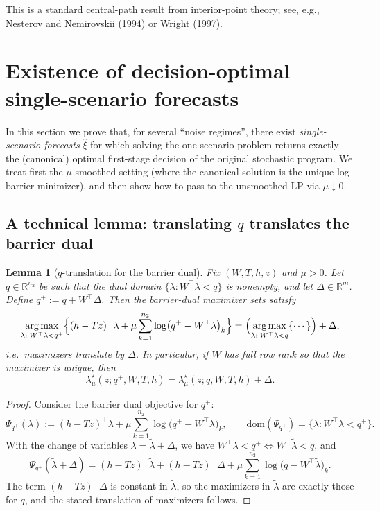\documentclass[11pt]{article}
\theoremstyle{plain}
\newtheorem{lemma}[theorem]{Lemma}
\theoremstyle{definition}
\theoremstyle{remark}
\newcommand{\argmax}{\operatorname*{arg\,max}}
\begin{document}
This is a standard central-path result from interior-point theory; see, e.g., Nesterov and Nemirovskii (1994) or Wright (1997).


\section{Existence of decision-optimal single-scenario forecasts}\label{sec:existence}

In this section we prove that, for several ``noise regimes'', there exist \emph{single-scenario forecasts}
$\hat\xi$ for which solving the one-scenario problem returns exactly the (canonical) optimal first-stage
decision of the original stochastic program. We treat first the $\mu$-smoothed setting (where the canonical
solution is the unique log-barrier minimizer), and then show how to pass to the unsmoothed LP via
$\mu\downarrow 0$.

\subsection[A technical lemma: translating q translates the barrier dual]{A technical lemma: translating $q$ translates the barrier dual}\label{subsec:q-translation}

\begin{lemma}[$q$-translation for the barrier dual]\label{lem:q-translation}
Fix $(W,T,h,z)$ and $\mu>0$. Let $q\in\mathbb{R}^{n_2}$ be such that the dual domain
$\{\lambda:W^\top\lambda<q\}$ is nonempty, and let $\Delta\in\mathbb{R}^m$.
Define $q^+:=q+W^\top\Delta$.
Then the barrier-dual maximizer sets satisfy
\begin{equation}\label{eq:q-translation}
\argmax_{\lambda:\;W^\top\lambda<q^+}
\Bigl\{(h-Tz)^\top\lambda+\mu\sum_{k=1}^{n_2}\log\bigl(q^+-W^\top\lambda\bigr)_k\Bigr\}
=
\Bigl(\argmax_{\lambda:\;W^\top\lambda<q}
\{\cdots\}\Bigr)+\Delta,
\end{equation}
i.e.\ maximizers translate by $\Delta$. In particular, if $W$ has full row rank so that the maximizer is unique,
then
\[
\lambda_\mu^\star(z;q^+,W,T,h)=\lambda_\mu^\star(z;q,W,T,h)+\Delta.
\]
\end{lemma}

\begin{proof}
Consider the barrier dual objective for $q^+$:
\[
\Psi_{q^+}(\lambda)
:=
(h-Tz)^\top\lambda+\mu\sum_{k=1}^{n_2}\log\bigl(q^+-W^\top\lambda\bigr)_k,
\qquad\text{dom}(\Psi_{q^+})=\{\lambda:W^\top\lambda<q^+\}.
\]
With the change of variables $\lambda=\tilde\lambda+\Delta$, we have
$W^\top\lambda<q^+ \iff W^\top\tilde\lambda<q$, and
\[
\Psi_{q^+}(\tilde\lambda+\Delta)
=
(h-Tz)^\top\tilde\lambda+(h-Tz)^\top\Delta
+\mu\sum_{k=1}^{n_2}\log\bigl(q-W^\top\tilde\lambda\bigr)_k.
\]
The term $(h-Tz)^\top\Delta$ is constant in $\tilde\lambda$, so the maximizers in $\tilde\lambda$ are exactly those
for $q$, and the stated translation of maximizers follows.
\end{proof}
\end{document}
